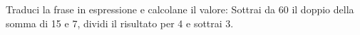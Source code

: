 \item Traduci la frase in espressione e calcolane il valore: Sottrai da 60 il doppio della somma di 15 e 7, dividi il risultato per 4 e sottrai 3.